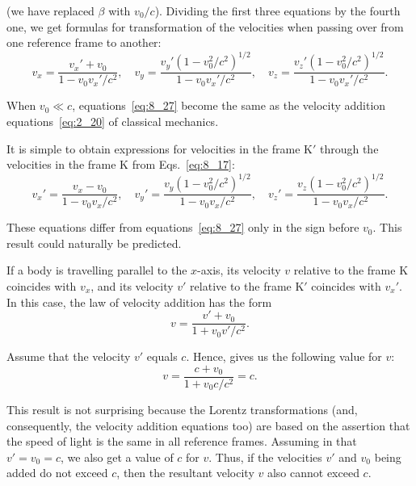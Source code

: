 \noindent
(we have replaced $\beta$ with $v_0/c$). Dividing the first three equations by the fourth one, we get formulas for transformation of the velocities when passing over from one reference frame to another:
\begin{equation}\label{eq:8_27}
	v_x = \frac{v_x'+v_0}{1 - v_0v_x'/c^2},\quad  v_y = \frac{v_y'\left(1-v_0^2/c^2\right)^{1/2}}{1 - v_0v_x'/c^2},\quad v_z = \frac{v_z'\left(1-v_0^2/c^2\right)^{1/2}}{1 - v_0v_x'/c^2}.
\end{equation}

\noindent
When $v_0\ll c$, equations~\eqref{eq:8_27} become the same as the velocity addition equations~\eqref{eq:2_20} of classical mechanics.

It is simple to obtain expressions for velocities in the frame K$'$ through the velocities in the frame K from Eqs.~\eqref{eq:8_17}:
\begin{equation}\label{eq:8_28}
	v_x' = \frac{v_x-v_0}{1 - v_0v_x/c^2},\quad  v_y' = \frac{v_y\left(1-v_0^2/c^2\right)^{1/2}}{1 - v_0v_x/c^2},\quad v_z' = \frac{v_z\left(1-v_0^2/c^2\right)^{1/2}}{1 - v_0v_x/c^2}.
\end{equation}

\noindent
These equations differ from equations~\eqref{eq:8_27} only in the sign before $v_0$. This result could naturally be predicted.

If a body is travelling parallel to the $x$-axis, its velocity $v$ relative to the frame K coincides with $v_x$, and its velocity $v'$ relative to the frame K$'$ coincides with $v_x'$. In this case, the law of velocity addition has the form
\begin{equation}\label{eq:8_29}
	v = \frac{v' + v_0}{1 + v_0 v'/c^2}.
\end{equation}

\noindent
Assume that the velocity $v'$ equals $c$. Hence,  gives us the following value for $v$:
\begin{equation*}
	v = \frac{c + v_0}{1 + v_0 c/c^2} = c.
\end{equation*}

\noindent
This result is not surprising because the Lorentz transformations (and, consequently, the velocity addition equations too) are based on the assertion that the speed of light is the same in all reference frames. Assuming in  that $v'=v_0=c$, we also get a value of $c$ for $v$. Thus, if the velocities $v'$ and $v_0$ being added do not exceed $c$, then the resultant velocity $v$ also cannot exceed $c$.

